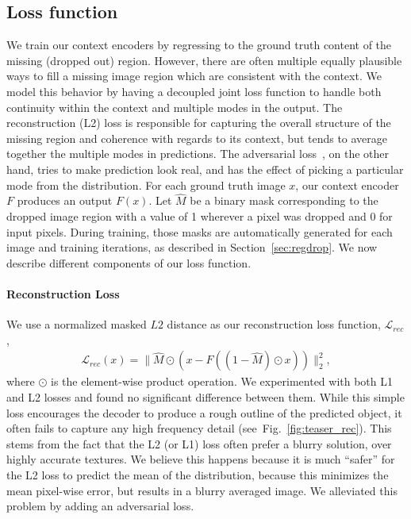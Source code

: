 \documentclass[10pt,twocolumn,letterpaper]{article}
\newcommand{\shortreffig}[1]{Fig.~\ref{fig:#1}}
\newcommand{\refsec}[1]{Section~\ref{sec:#1}}
\newcommand{\lbleq}[1]{\label{eq:#1}}
\begin{document}
%
%

%
%
%
%
%
%
%
%
%
%
%
%
%
%
%
%
%
%
%
%
%
%
%
%
%
%
%
%
%
%
%
%
%
%
%
%
%
%
%
%
%

\subsection{Loss function}
\label{sec:loss}
We train our context encoders by regressing to the ground truth content of the missing (dropped out) region.
However, there are often multiple equally plausible ways to fill a missing image region which are consistent with the context.
%
We model this behavior by having a decoupled joint loss function to handle both continuity within the context and multiple modes in the output.
The reconstruction (L2) loss is responsible for capturing the overall structure of the missing region and coherence with regards to its context, but tends to average together the multiple modes in predictions.
The adversarial loss~\cite{goodfellow2014generative}, on the other hand,  tries to make prediction look real, and has the effect of picking a particular mode from the distribution.
For each ground truth image $x$, our context encoder $F$ produces an output $F(x)$.
Let $\hat{M}$ be a binary mask corresponding to the dropped image region with a value of 1 wherever a pixel was dropped and 0 for input pixels.
During training, those masks are automatically generated for each image and training iterations, as described in \refsec{regdrop}.
We now describe different components of our loss function.

\paragraph{Reconstruction Loss}
We use a normalized masked $L2$ distance as our reconstruction loss function, $\mathcal{L}_{rec}$,
\begin{align}
\mathcal{L}_{rec}(x) = \|\hat{M}\odot(x-F((1-\hat{M})\odot x))\|_2^2 \lbleq{loss_rec},
\end{align}
where $\odot$ is the element-wise product operation.
We experimented with both L1 and L2 losses and found no significant difference between them.
While this simple loss encourages the decoder to produce a rough outline of the predicted object, it often fails to capture any high frequency detail (see~\shortreffig{teaser_rec}).
This stems from the fact that the L2 (or L1) loss often prefer a blurry  solution, over highly accurate textures.
We believe this happens because it is much ``safer'' for the L2 loss to predict the mean of the distribution, because this minimizes the mean pixel-wise error, but results in a blurry averaged image.
%
We alleviated this problem by adding an adversarial loss.
\end{document}
